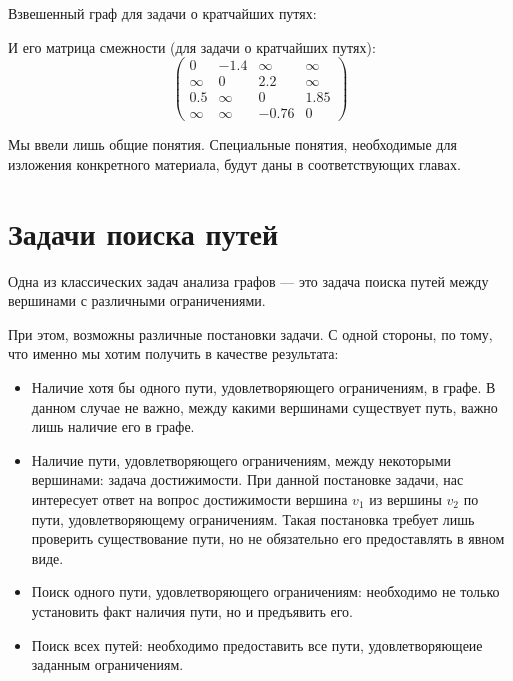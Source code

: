 \begin{example}
  Взвешенный граф для задачи о кратчайших путях:
  \begin{center}
  \end{center}

  И его матрица смежности (для задачи о кратчайших путях):
  $$
  \begin{pmatrix}
    0 & -1.4 & \infty & \infty \\
    \infty & 0 & 2.2 & \infty \\
    0.5 & \infty & 0 & 1.85 \\
    \infty & \infty & -0.76 & 0
  \end{pmatrix}
  $$
\end{example}

Мы ввели лишь общие понятия.
Специальные понятия, необходимые для изложения конкретного материала, будут даны в соответствующих главах.

\section{Задачи поиска путей}

Одна из классических задач анализа графов --- это задача поиска путей между вершинами с различными ограничениями.

При этом, возможны различные постановки задачи.
С одной стороны, по тому, что именно мы хотим получить в качестве результата:
\begin{itemize}
\item Наличие хотя бы одного пути, удовлетворяющего ограничениям, в графе. В данном случае не важно, между какими вершинами существует путь, важно лишь наличие его в графе.
\item Наличие пути, удовлетворяющего ограничениям, между некоторыми вершинами: задача достижимости.
      При данной постановке задачи, нас интересует ответ на вопрос достижимости вершина $v_1$ из вершины $v_2$ по пути, удовлетворяющему ограничениям.
      Такая постановка требует лишь проверить существование пути, но не обязательно его предоставлять в явном виде.
\item Поиск одного пути, удовлетворяющего ограничениям: необходимо не только установить факт наличия пути, но и  предъявить его.
\item Поиск всех путей: необходимо предоставить все пути, удовлетворяющеие заданным ограничениям.
\end{itemize}

